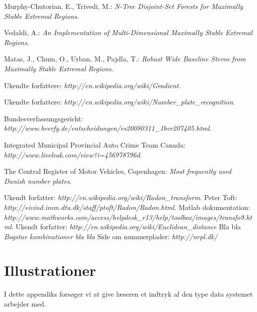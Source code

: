 \documentclass[11pt,a4paper,final]{article}
\begin{document}
\begin{thebibliography}{99}




 Murphy-Chutorian, E., Trivedi, M.: \textit{N-Tree Disjoint-Set Forests for Maximally Stable Extremal Regions}.

 Vedaldi, A.: \textit{An Implementation of Multi-Dimensional Maximally Stable Extremal Regions}.

 Matas, J., Chum, O., Urban, M., Pajdla, T.: \textit{Robust Wide Baseline Stereo from Maximally Stable Extremal Regions}.

Ukendte forfattere: \textit{http://en.wikipedia.org/wiki/Gradient}.

 Ukendte forfattere: \textit{http://en.wikipedia.org/wiki/Number\_plate\_recognition}.

Bundesverfassungsgericht: \textit{http://www.bverfg.de/entscheidungen/rs20080311\_1bvr207405.html}.

Integrated Municipal Provincial Auto Crime Team Canada: \textit{http://www.liveleak.com/view?i=456978796d}.


 The Central Register of Motor Vehicles, Copenhagen: \textit{Most frequently used Danish number plates}.

 Ukendt forfatter: \textit{http://en.wikipedia.org/wiki/Radon\_transform}.
 Peter Toft: \textit{http://eivind.imm.dtu.dk/staff/ptoft/Radon/Radon.html}.
 Matlab dokumentation: \textit{http://www.mathworks.com/access/helpdesk\_r13/help/toolbox/images/transfo9.html}.
 Ukendt forfatter: \textit{http://en.wikipedia.org/wiki/Euclidean\_distance}
 Bla bla \textit{Bogstav kombinationer bla bla}
 Side om nummerplader: \textit{http://nrpl.dk/}


\end{thebibliography}

\appendix


\newpage
\section{Illustrationer}
\label{sec:illu}
I dette appendiks forsøger vi at give læseren et indtryk af den type data systemet arbejder med.
\end{document}
